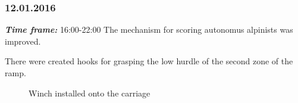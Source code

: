 \subsubsection{12.01.2016}
\textit{\textbf{Time frame:}} 16:00-22:00 \newline
The mechanism for scoring autonomus alpinists was improved.

There were created hooks for grasping the low hurdle of the second zone of the ramp.

\begin{figure}[H]
	\begin{minipage}[h]{0.58\linewidth}
		\caption{Winch installed onto the carriage}
	\end{minipage}
	\hfill
	\begin{minipage}[h]{0.37\linewidth}

\end{minipage}
\end{figure}
